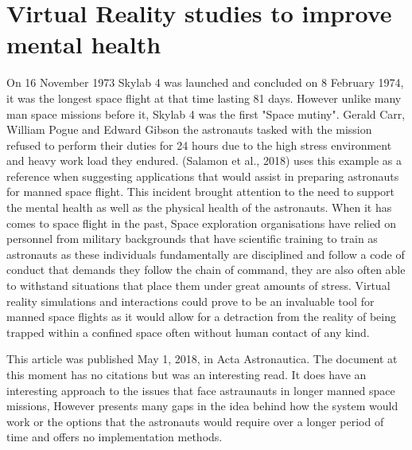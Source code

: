 \documentclass[10pt,journal,compsoc]{IEEEtran}
\begin{document}
	\section{Virtual Reality studies to improve mental health}
	 On 16 November 1973 Skylab 4 was launched and concluded on 8 February 1974, it was the longest space flight at that time lasting 81 days. However unlike many man space missions before it, Skylab 4 was the first "Space mutiny". Gerald Carr, William Pogue and Edward Gibson the astronauts tasked with the mission refused to perform their duties for 24 hours due to the high stress environment and heavy work load they endured. (Salamon et al., 2018) uses this example as a reference when suggesting applications that would assist in preparing astronauts for manned space flight. This incident brought attention to the need to support the mental health as well as the physical health of the astronauts. When it has comes to space flight in the past, Space exploration organisations have relied on personnel from military backgrounds that have scientific training to train as astronauts as these individuals fundamentally are disciplined and follow a code of conduct that demands they follow the chain of command, they are also often able to withstand situations that place them under great amounts of stress. Virtual reality simulations and interactions could prove to be an invaluable tool for manned space flights as it would allow for a detraction from the reality of being trapped within a confined space often without human contact of any kind. \newline 
	 
	 This article was published May 1, 2018, in Acta Astronautica. The document at this moment has no citations but was an interesting read. It does have an interesting approach to the issues that face astraunauts in longer manned space missions, However presents many gaps in the idea behind how the system would work or the options that the astronauts would require over a longer period of time and offers no implementation methods.\newline
	 
\end{document}
